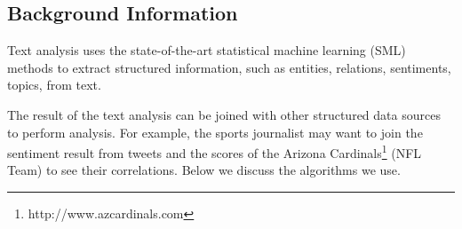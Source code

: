 \documentclass[11pt,onecolumn]{article}
\begin{document}
  \subsection{Background Information}

    Text analysis uses the state-of-the-art statistical machine learning (SML) methods to extract structured information,
    such as entities, relations, sentiments, topics, from text.

    The result of the text analysis can be joined with other
    structured data sources to perform analysis. For example, the sports
    journalist may want to join the sentiment result from tweets and the
    scores of the Arizona Cardinals\footnote{http://www.azcardinals.com}
    (NFL Team) to see their correlations.
		Below we discuss the algorithms we use.
\end{document}
